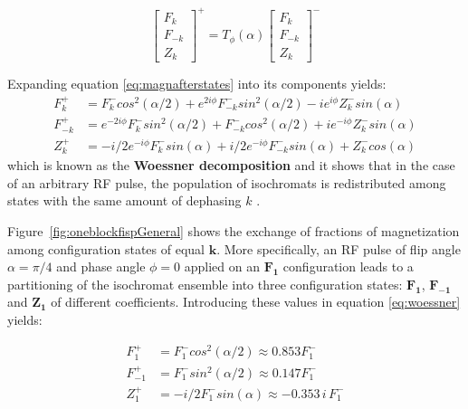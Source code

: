 \begin{equation}\label{eq:magnafterstates}
    \begin{bmatrix} 
    F_{k} \\
    F_{-k} \\
    Z_{k}
    \end{bmatrix}^+ = 
        T_{\phi}(\alpha)
    \begin{bmatrix} 
    F_{k} \\
    F_{-k} \\
    Z_{k}
    \end{bmatrix}^-
\end{equation}

\hfill 

Expanding equation \ref{eq:magnafterstates} into its components yields:
\begin{equation}\label{eq:woessner}
\begin{split}
    F_{k}^+ &= F_{k}^- cos^2(\alpha/2) + e^{2i\phi} F_{-k}^- sin^2(\alpha/2)  - i e^{i \phi} Z_{k}^- sin(\alpha)  \\
    F_{-k}^+ &=  e^{-2i\phi} F_{k}^- sin^2(\alpha/2) + F_{-k}^- cos^2(\alpha/2) + i e^{-i \phi} Z_{k}^- sin(\alpha) \\
    Z_{k}^+ &= - i/2 e^{-i \phi} F_{k}^- sin(\alpha) + i/2 e^{-i \phi} F_{-k}^- sin(\alpha) + Z_{k}^- cos(\alpha) 
\end{split}
\end{equation}
which is known as the \textbf{Woessner decomposition} and it shows that in the case of an arbitrary RF pulse, the population of isochromats is redistributed among states with the same amount of dephasing $k$ \cite{Hennig1991}.

\hfill

Figure~\ref{fig:oneblockfispGeneral} shows the exchange of fractions of magnetization among configuration states of equal $\bm{k}$.
More specifically, an RF pulse of flip angle $\alpha = \pi/4$ and phase angle $\phi = 0$ applied on an $\bm{F_1}$ configuration leads to a partitioning of the isochromat ensemble into three configuration states: $\bm{F_1}$, $\bm{F_{-1}}$ and $\bm{Z_1}$ of different coefficients.
Introducing these values in equation \ref{eq:woessner} yields:

\begin{equation}
\begin{split}
    F_{1}^+  &= F_{1}^- cos^2(\alpha/2) \approx 0.853 F_{1}^- \\
    F_{-1}^+ &= F_{1}^- sin^2(\alpha/2) \approx 0.147 F_{1}^-   \\
    Z_{1}^+  &= - i/2 F_{1}^- sin(\alpha)  \approx - 0.353 \, i \, F_{1}^-
\end{split}
\end{equation}


